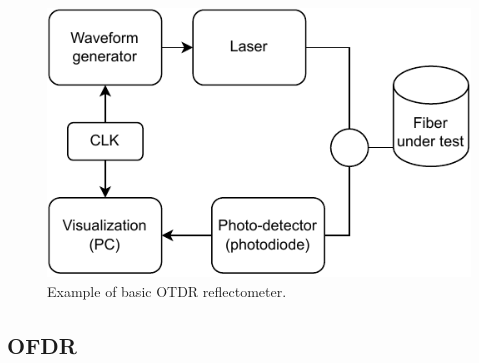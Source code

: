 \begin{figure}
    \centering
    \includegraphics{pdf/optic_reflectometer.drawio.pdf}
    \caption{Example of basic OTDR reflectometer.}
    \label{fig:simpleotdr}
\end{figure}









\subsection{OFDR}\label{txt.reflectometry.ofdr}

